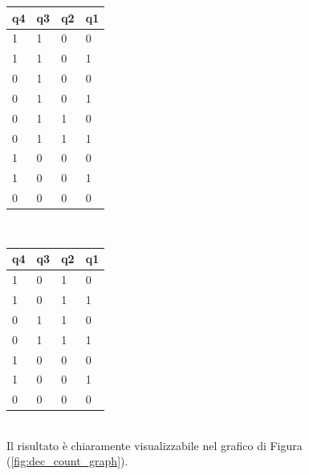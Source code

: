 \documentclass[journal, a4paper]{IEEEtran}
\begin{document}
\begin{table}[h]
\centering
\begin{tabular}{l|l|l|l}
\textbf{q4} & \textbf{q3} & \textbf{q2} & \textbf{q1} \\
\hline
1 & 1 & 0 & 0 \\

1 & 1 & 0 & 1 \\

0 & 1 & 0 & 0 \\

0 & 1 & 0 & 1 \\

0 & 1 & 1 & 0 \\

0 & 1 & 1 & 1 \\

1 & 0 & 0 & 0 \\

1 & 0 & 0 & 1 \\

0 & 0 & 0 & 0 \\
\hline
\end{tabular}
\end{table}
~\\
\begin{table}[h]
\centering
\begin{tabular}{l|l|l|l}
\textbf{q4} & \textbf{q3} & \textbf{q2} & \textbf{q1} \\
\hline
1 & 0 & 1 & 0 \\

1 & 0 & 1 & 1 \\

0 & 1 & 1 & 0 \\

0 & 1 & 1 & 1 \\

1 & 0 & 0 & 0 \\

1 & 0 & 0 & 1 \\

0 & 0 & 0 & 0 \\
\hline
\end{tabular}
\end{table}
~\\
 
Il risultato è chiaramente visualizzabile nel grafico di Figura (\ref{fig:dec_count_graph}).
\end{document}
